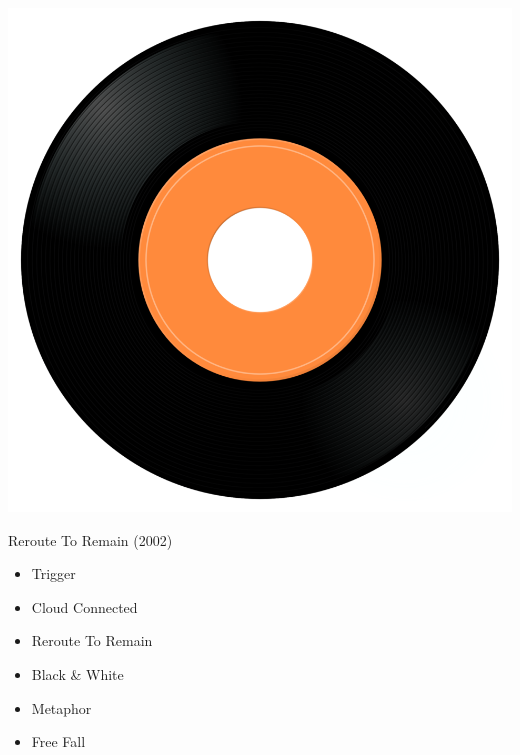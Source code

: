 \begin{minipage}[t]{0.25\textwidth}\vspace{0pt}
\captionsetup{type=figure}
\includegraphics[width=\textwidth]{Images/cover.png}
\caption*{Reroute To Remain (2002)}
\end{minipage}
\begin{minipage}[t]{0.25\textwidth}\vspace{0pt}
\begin{itemize}[nosep,leftmargin=1em,labelwidth=*,align=left]
	\setlength{\itemsep}{0pt}
	\item Trigger
	\item Cloud Connected
	\item Reroute To Remain
	\item Black \& White
	\item Metaphor
	\item Free Fall
\end{itemize}
\end{minipage}
